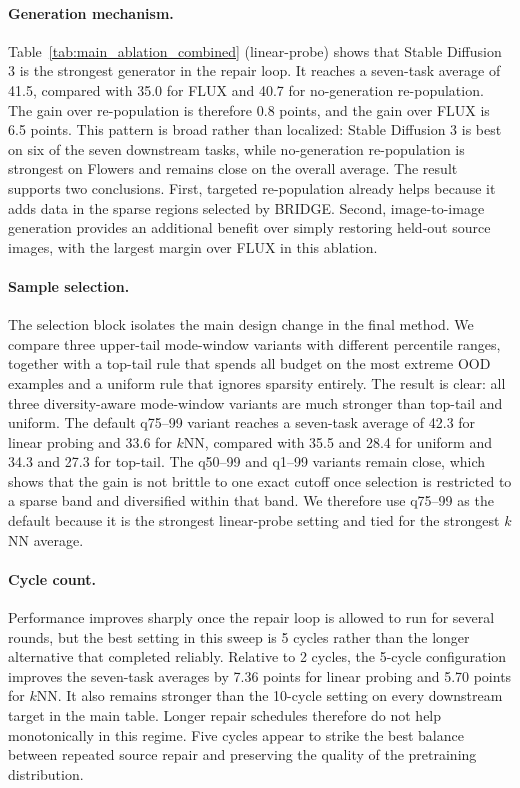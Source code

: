 \documentclass{article}
\begin{document}
\paragraph{Generation mechanism.}
Table~\ref{tab:main_ablation_combined} (linear-probe) shows that Stable Diffusion 3 is the strongest generator in the repair loop. It reaches a seven-task average of 41.5, compared with 35.0 for FLUX and 40.7 for no-generation re-population. The gain over re-population is therefore 0.8 points, and the gain over FLUX is 6.5 points. This pattern is broad rather than localized: Stable Diffusion 3 is best on six of the seven downstream tasks, while no-generation re-population is strongest on Flowers and remains close on the overall average. The result supports two conclusions. First, targeted re-population already helps because it adds data in the sparse regions selected by BRIDGE. Second, image-to-image generation provides an additional benefit over simply restoring held-out source images, with the largest margin over FLUX in this ablation.

\paragraph{Sample selection.}
The selection block isolates the main design change in the final method. We compare three upper-tail mode-window variants with different percentile ranges, together with a top-tail rule that spends all budget on the most extreme OOD examples and a uniform rule that ignores sparsity entirely. The result is clear: all three diversity-aware mode-window variants are much stronger than top-tail and uniform. The default q75--99 variant reaches a seven-task average of 42.3 for linear probing and 33.6 for $k$NN, compared with 35.5 and 28.4 for uniform and 34.3 and 27.3 for top-tail. The q50--99 and q1--99 variants remain close, which shows that the gain is not brittle to one exact cutoff once selection is restricted to a sparse band and diversified within that band. We therefore use q75--99 as the default because it is the strongest linear-probe setting and tied for the strongest $k$NN average.

\paragraph{Cycle count.}
Performance improves sharply once the repair loop is allowed to run for several rounds, but the best setting in this sweep is 5 cycles rather than the longer alternative that completed reliably. Relative to 2 cycles, the 5-cycle configuration improves the seven-task averages by 7.36 points for linear probing and 5.70 points for $k$NN. It also remains stronger than the 10-cycle setting on every downstream target in the main table. Longer repair schedules therefore do not help monotonically in this regime. Five cycles appear to strike the best balance between repeated source repair and preserving the quality of the pretraining distribution.
\end{document}

